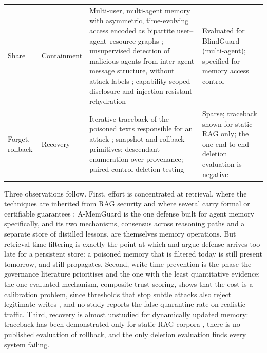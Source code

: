 \documentclass[11pt]{article}
\begin{document}
\begin{table}[p]
\begin{tabularx}{\textwidth}{L{1.4cm} L{2.05cm} X L{2.5cm}}
Share & Containment & Multi-user, multi-agent memory with asymmetric, time-evolving access encoded as bipartite user--agent--resource graphs \citep{rezazadeh2025collaborative}; unsupervised detection of malicious agents from inter-agent message structure, without attack labels \citep{miao2026blindguard}; capability-scoped disclosure and injection-resistant rehydration \citep{ravindran2026portable} & Evaluated for BlindGuard (multi-agent); specified for memory access control \\
Forget, rollback & Recovery & Iterative traceback of the poisoned texts responsible for an attack \citep{zhang2025ragforensics}; snapshot and rollback primitives; descendant enumeration over provenance; paired-control deletion testing \citep{xie2026bemula} & Sparse; traceback shown for static RAG only; the one end-to-end deletion evaluation is negative \\
\bottomrule
\end{tabularx}
\end{table}

Three observations follow. First, effort is concentrated at retrieval, where the techniques are inherited from RAG security and where several carry formal or certifiable guarantees \citep{xiang2024robustrag}; A-MemGuard \citep{wei2025amemguard} is the one defense built for agent memory specifically, and its two mechanisms, consensus across reasoning paths and a separate store of distilled lessons, are themselves memory operations. But retrieval-time filtering is exactly the point at which \citet{lin2026security} and \citet{li2026memtx} argue defense arrives too late for a persistent store: a poisoned memory that is filtered today is still present tomorrow, and still propagates. Second, write-time prevention is the phase the governance literature prioritises and the one with the least quantitative evidence; the one evaluated mechanism, composite trust scoring, shows that the cost is a calibration problem, since thresholds that stop subtle attacks also reject legitimate writes \citep{sunil2026poisoning}, and no study reports the false-quarantine rate on realistic traffic. Third, recovery is almost unstudied for dynamically updated memory: traceback has been demonstrated only for static RAG corpora \citep{zhang2025ragforensics}, there is no published evaluation of rollback, and the only deletion evaluation finds every system failing.
\end{document}
